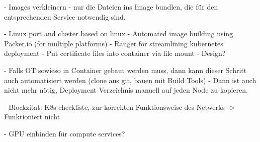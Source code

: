 - Images verkleinern - nur die Dateien ins Image bundlen, die für den entsprechenden Service notwendig sind.

- Linux  port and cluster based on linux
- Automated image building using Packer.io (for multiple platforms)
- Ranger for streamlining kubernetes deployment
- Put certificate files into container via file mount - Design?

- Falls OT sowieso in Container gebaut werden muss, dann kann dieser Schritt auch automatisiert werden (clone aus git, bauen mit Build Tools)
- Dann ist auch nicht mehr nötig, Deployment Verzeichnis manuell auf jeden Node zu kopieren.


- Blockzitat: K8s checkliste, zur korrekten Funktionsweise des Netwerks -> Funktioniert nicht

- GPU einbinden für compute services?


